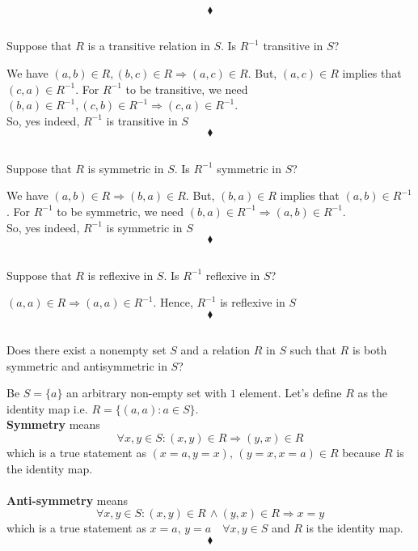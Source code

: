 $$\blacklozenge$$
\subsection{}
\begin{tcolorbox}
 Suppose that $R$ is a transitive relation in $S$. Is $R^{-1}$ transitive in $S$? 
\end{tcolorbox}
$$ $$
We have $(a,b)\in R, (b,c)\in R\Rightarrow (a,c)\in R$. But, $(a,c)\in R$ implies that $(c,a)\in R^{-1}$.
For $R^{-1}$ to be transitive, we need $(b,a)\in R^{-1}, (c,b)\in R^{-1}\Rightarrow (c,a)\in R^{-1}$. \\
So, yes indeed, $R^{-1}$ is transitive in $S$
$$\blacklozenge$$


\subsection{}
\begin{tcolorbox}
Suppose that $R$ is symmetric in $S$. Is $R^{-1}$ symmetric in $S$? 
\end{tcolorbox}
$$ $$
We have $(a,b)\in R\Rightarrow (b,a)\in R$. But, $(b,a)\in R$ implies that $(a,b)\in R^{-1}$.
For $R^{-1}$ to be symmetric, we need $(b,a)\in R^{-1}\Rightarrow (a,b)\in R^{-1}$. \\
So, yes indeed, $R^{-1}$ is symmetric in $S$
$$\blacklozenge$$


\subsection{}
\begin{tcolorbox}
 Suppose that $R$ is reflexive in $S$. Is $R^{-1}$ reflexive in $S$?
 \end{tcolorbox}
$$ $$
$(a,a)\in R\Rightarrow (a,a)\in R^{-1}$. Hence, $R^{-1}$ is reflexive in $S$
$$\blacklozenge$$


\subsection{}
\begin{tcolorbox}
Does there exist a nonempty set $S$ and a relation $R$ in $S$ such that $R$ is both symmetric and antisymmetric in $S$? 
\end{tcolorbox}
$$ $$
Be $S=\{a\}$ an arbitrary non-empty set with $1$ element. Let's define $R$ as the identity map i.e. $R=\{(a,a):a\in S\}$.\\
\textbf{Symmetry} means
$$\forall x,y\in S:(x,y)\in R \Rightarrow (y,x)\in R$$ which is a true statement as $(x=a,y=x),\, (y=x,x=a)\in R$ because $R$ is the identity map.\\\\
\textbf{Anti-symmetry} means
$$\forall x,y\in S:(x,y)\in R \, \wedge (y,x)\in R \Rightarrow x=y$$ which is a true statement as $x=a,\, y=a\quad \forall x,y\in S$ and $R$ is the identity map.
$$\blacklozenge$$


